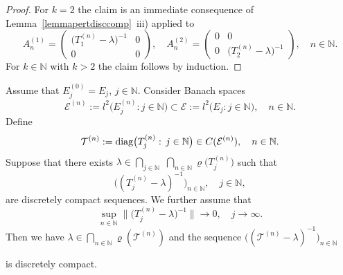 \documentclass[a4paper,reqno]{amsart}
\begin{document}
\begin{proof}
For $k=2$ the claim is an immediate consequence of Lemma~\ref{lemmapertdisccomp}~iii) applied to 
\begin{equation*} A_n^{(1)}=\begin{pmatrix} \big(T_1^{(n)}-\lambda\big)^{-1} & 0 \\ 0 & 0\end{pmatrix}, \quad A_n^{(2)}=\begin{pmatrix} 0 & 0 \\ 0 & \big(T_2^{(n)}-\lambda\big)^{-1}\end{pmatrix}, \quad n\in{\mathbb{N}}.\end{equation*}
For $k\in{\mathbb{N}}$ with $k>2$ the claim follows by induction.
\end{proof}

\begin{theorem}
Assume that $E_j^{(0)}=E_j$, $j\in{\mathbb{N}}$.
Consider  Banach spaces $${\mathcal E}^{(n)}:=l^2\big(E_j^{(n)}: j\in{\mathbb{N}}\big)\subset {\mathcal E}:=l^2\big(E_j:j\in{\mathbb{N}}\big), \quad n\in{\mathbb{N}}.$$  
Define $${\mathcal T}^{(n)}:={{\rm diag} }\big(T_j^{(n)}:\,j\in{\mathbb{N}}\big)\in C({\mathcal E}^{(n)}), \quad n\in{\mathbb{N}}.$$
 Suppose that there exists $\lambda\in\underset{j\in{\mathbb{N}}}{\bigcap}\,\,\underset{n\in{\mathbb{N}}}{\bigcap}\varrho\big(T_j^{(n)}\big)$ such that 
$$\big((T_j^{(n)}-\lambda)^{-1}\big)_{n\in{\mathbb{N}}}, \quad j\in{\mathbb{N}},$$ are discretely compact sequences.
We further assume that 
\begin{equation} \label{univresconv}
\sup_{n\in{\mathbb{N}}}\big\|\big(T_j^{(n)}-\lambda\big)^{-1}\big\|{\longrightarrow} 0, \quad j\to\infty.
\end{equation}
Then we have $\lambda\in\underset{n\in{\mathbb{N}}}{\bigcap}\varrho({\mathcal T}^{(n)})$ and the sequence  $\big(({\mathcal T}^{(n)}-\lambda)^{-1}\big)_{n\in{\mathbb{N}}}$
 
is discretely compact.
\label{discrcompresdiag}
\end{theorem}
\end{document}

